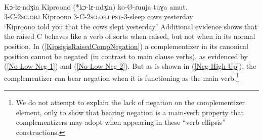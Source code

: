 \documentclass[output=paper
,modfonts
,nonflat
]{langsci/langscibook}
\begin{document}
\ea \label{KipsigisRaisedComp}
\\
\gll Kɔ-lɛ-ndʒin Kiproono (*kɔ-lɛ-ndʒin) ko-\O-ɾuuja tuɣa amut. \\
3-C-2\textsc{sg}.\textsc{obj} Kiproono 3-C-2\textsc{sg}.\textsc{obj} \textsc{pst}-3-sleep cows yesterday \\
\glt `Kiproono told you that the cows slept yesterday.'
\z
\noindent Additional evidence shows that the raised C behaves like a verb of sorts when raised, but not when in its normal position. In (\ref{KipsigisRaisedCompNegation}) a complementizer in its canonical position cannot be negated (in contrast to main clause verbs), as evidenced by (\ref{No Low Neg 1}) and (\ref{No Low Neg 2}). But as is shown in (\ref{Neg High Up}), the complementizer can bear negation when it is functioning as the main verb.\footnote{We do not attempt to explain the lack of negation on the complementizer element, only to show that bearing negation is a main-verb property that complementizers may adopt when appearing in these ``verb ellipsis'' constructions.} 
\end{document}
